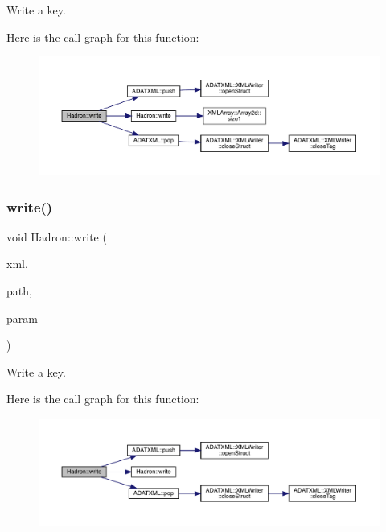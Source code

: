 Write a key. 

Here is the call graph for this function\+:
\nopagebreak
\begin{figure}[H]
\begin{center}
\leavevmode
\includegraphics[width=350pt]{d1/daf/namespaceHadron_ad432e121844a2fa83775051e43481116_cgraph}
\end{center}
\end{figure}
\mbox{\label{namespaceHadron_a4b91e53beed52be0c8431a4464285dfd}} 
\subsubsection{\texorpdfstring{write()}{write()}\hspace{0.1cm}{\footnotesize\ttfamily [23/95]}}
{\footnotesize\ttfamily void Hadron\+::write (\begin{DoxyParamCaption}\item[{\mbox{\hyperlink{classADATXML_1_1XMLWriter}{X\+M\+L\+Writer}} \&}]{xml,  }\item[{const std\+::string \&}]{path,  }\item[{const \mbox{\hyperlink{structHadron_1_1KeyTetraQuarkElementalOperator__t}{Key\+Tetra\+Quark\+Elemental\+Operator\+\_\+t}} \&}]{param }\end{DoxyParamCaption})}



Write a key. 

Here is the call graph for this function\+:
\nopagebreak
\begin{figure}[H]
\begin{center}
\leavevmode
\includegraphics[width=350pt]{d1/daf/namespaceHadron_a4b91e53beed52be0c8431a4464285dfd_cgraph}
\end{center}
\end{figure}
\mbox{\label{namespaceHadron_ac358b1203bd94f6b26452402911ce174}} 
